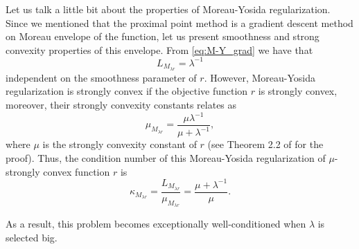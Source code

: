 Let us talk a little bit about the properties of Moreau-Yosida regularization. Since we mentioned that the proximal point method is a gradient descent method on Moreau envelope of the function, let us present smoothness and strong convexity properties of this envelope. From \eqref{eq:M-Y_grad} we have that 
\begin{equation}\label{eq:M-Y_smoothness}
L_{M_{\lambda r}} = \lambda^{-1}
\end{equation}
independent on the smoothness parameter of $r$. However, Moreau-Yosida regularization is strongly convex if the objective function $r$ is strongly convex, moreover, their strongly convexity constants relates as
\begin{equation}\label{eq:M-Y_strongly}
\mu_{M_{\lambda r}} = \frac{\mu\lambda^{-1}}{\mu + \lambda^{-1}},
\end{equation}
where $\mu$ is the strongly convexity constant of $r$ (see Theorem 2.2 of \cite{lemarechal1997practical} for the proof). Thus, the condition number of this Moreau-Yosida regularization of $\mu$-strongly convex function $r$ is 
\begin{equation}\label{eq:M-Y_condition}
\kappa_{M_{\lambda r}} = \frac{L_{M_{\lambda r}}}{\mu_{M_{\lambda r}}} = \frac{\mu + \lambda^{-1}}{\mu}.
\end{equation}

As a result, this problem becomes exceptionally well-conditioned when $\lambda$ is selected big.






